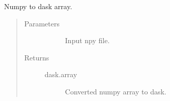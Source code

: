 \documentclass[letterpaper,10pt,english]{sphinxmanual}
\begin{document}

\begin{fulllineitems}
\label{\detokenize{index:pathflowai.utils.npy2da}}
Numpy to dask array.
\begin{quote}\begin{description}
\item[{Parameters}] \leavevmode\begin{description}
\item[{}] \leavevmode
Input npy file.

\end{description}

\item[{Returns}] \leavevmode\begin{description}
\item[{dask.array}] \leavevmode
Converted numpy array to dask.

\end{description}

\end{description}\end{quote}

\end{fulllineitems}

\end{document}
